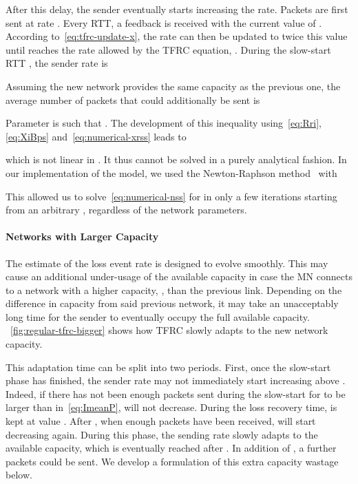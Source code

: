 \documentclass[twocolumn]{nictatechreport}
\begin{document}
After this delay, the sender eventually starts increasing the rate. Packets are
first sent at rate . Every RTT, a feedback is received with the current
value of . According to~\eqref{eq:tfrc-update-x}, the rate can
then be updated to twice this value until  reaches the rate allowed by
the TFRC equation, . During
the slow-start RTT , the sender rate is

Assuming the new network provides the same capacity as the previous one, the
average number of packets that could additionally be sent is 

Parameter  is such that . The development of this inequality
using~\eqref{eq:Rri}, \eqref{eq:XiBps} and~\eqref{eq:numerical-xrss} leads to

which is not linear in . It thus cannot be solved in a purely
analytical fashion. In our implementation of the model, we used the
Newton-Raphson method~\cite{1995ypma_newton-raphson} with 

This allowed us to solve~\eqref{eq:numerical-nss} for  in only a few
iterations starting from an arbitrary , regardless of the network
parameters.

\paragraph{Networks with Larger Capacity} The estimate of the loss event rate
 is designed to evolve smoothly. This may cause an additional under-usage of
the available capacity in case the MN connects to a network with a higher
capacity, , than the previous link.  Depending on the difference
in capacity from said previous network, it may take an unacceptably long time
for the sender to eventually occupy the full available capacity.
\figurename~\ref{fig:regular-tfrc-bigger} shows how TFRC slowly adapts to the
new network capacity.

This adaptation time can be split into two periods.  First, once the
slow-start phase has finished, the sender rate may not immediately start
increasing above . Indeed, if there has not been enough packets sent during
the slow-start for  to be larger than  in~\eqref{eq:ImeanP}, 
will not decrease. During the loss recovery time,  is kept at
value . After , when enough
packets have been received,  will start decreasing again. During this phase,
the sending rate slowly adapts to the available capacity, which is eventually
reached after . In addition of
, a further  packets could be sent.
We develop a formulation of this extra capacity wastage below.
\end{document}

